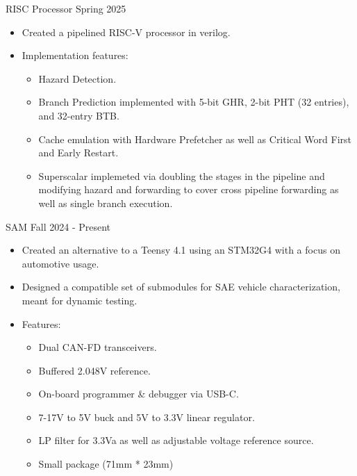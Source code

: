 \documentclass[9pt]{developercv} %
\begin{document}
\vspace{-14 pt}
\begin{entrylist}
    \entry
    {}
    {RISC Processor}
    {Spring 2025}
    {\vspace{-8pt}
    \begin{itemize}[noitemsep,topsep=0pt,parsep=0pt,partopsep=0pt, leftmargin=10pt]
    \item Created a pipelined RISC-V processor in verilog.
    \item Implementation features: 
        \begin{itemize}[noitemsep,topsep=0pt,parsep=0pt,partopsep=0pt,leftmargin=10pt]
            \item Hazard Detection.
            \item Branch Prediction implemented with  5-bit GHR, 2-bit PHT (32 entries), and 32-entry BTB. 
            \item Cache emulation with Hardware Prefetcher as well as Critical Word First and Early Restart.
            \item Superscalar implemeted via doubling the stages in the pipeline and modifying hazard and forwarding to cover cross pipeline forwarding as well as single branch execution.
        \end{itemize}
    \end{itemize}
    }

    \entry
    {}
    {SAM}
    {Fall 2024 - Present}
    {\vspace{-8pt}
    \begin{itemize}[noitemsep,topsep=0pt,parsep=0pt,partopsep=0pt, leftmargin=10pt]
    \item Created an alternative to a Teensy 4.1 using an STM32G4 with a focus on automotive usage.
    \item Designed a compatible set of submodules for SAE vehicle characterization, meant for dynamic testing.
    \item Features:    
        \begin{itemize}[noitemsep,topsep=0pt,parsep=0pt,partopsep=0pt, leftmargin=10pt]
            \item Dual CAN-FD transceivers.
            \item Buffered 2.048V reference.
            \item On-board programmer \& debugger via USB-C.
            \item 7-17V to 5V buck and 5V to 3.3V linear regulator.
            \item LP filter for 3.3Va as well as adjustable voltage reference source. 
            \item Small package (71mm * 23mm)
            
        \end{itemize}
    \end{itemize}
    }
    
\end{entrylist}
\end{document}
